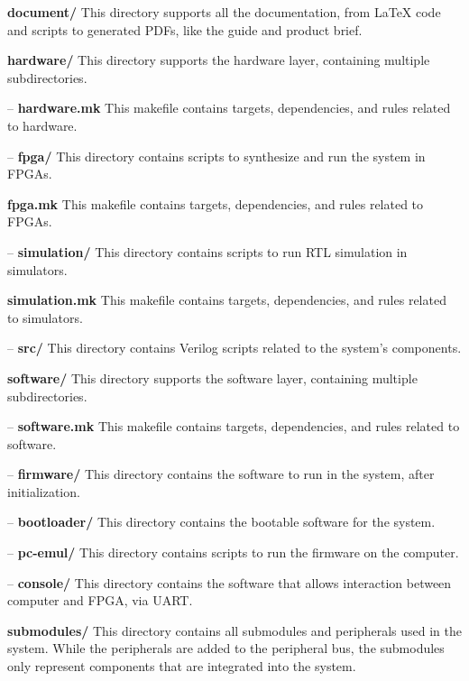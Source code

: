 \textbf{document/} This directory supports all the documentation, from LaTeX code and scripts to generated PDFs, like the guide and product brief.

\textbf{hardware/} This directory supports the hardware layer, containing multiple subdirectories.

\hspace{0.5cm} – \textbf{hardware.mk} This makefile contains targets, dependencies, and rules related to hardware.

\hspace{0.5cm} – \textbf{fpga/} This directory contains scripts to synthesize and run the system in FPGAs.

\hspace{1.2cm}\textbf{fpga.mk} This makefile contains targets, dependencies, and rules related to FPGAs.

\hspace{0.5cm} – \textbf{simulation/} This directory contains scripts to run RTL simulation in simulators.

\hspace{1.2cm}\textbf{simulation.mk} This makefile contains targets, dependencies, and rules related to simulators.

\hspace{0.5cm}– \textbf{src/} This directory contains Verilog scripts related to the system’s components.

\textbf{software/} This directory supports the software layer, containing multiple subdirectories.

\hspace{0.5cm}– \textbf{software.mk} This makefile contains targets, dependencies, and rules related to software.

\hspace{0.5cm}– \textbf{firmware/} This directory contains the software to run in the system, after initialization.

\hspace{0.5cm}– \textbf{bootloader/} This directory contains the bootable software for the system.

\hspace{0.5cm}– \textbf{pc-emul/} This directory contains scripts to run the firmware on the computer.

\hspace{0.5cm}– \textbf{console/} This directory contains the software that allows interaction between computer and FPGA, via UART.

\textbf{submodules/} This directory contains all submodules and peripherals used in the system. While the peripherals are added to the peripheral bus, the submodules only represent components that are integrated into the system. 

